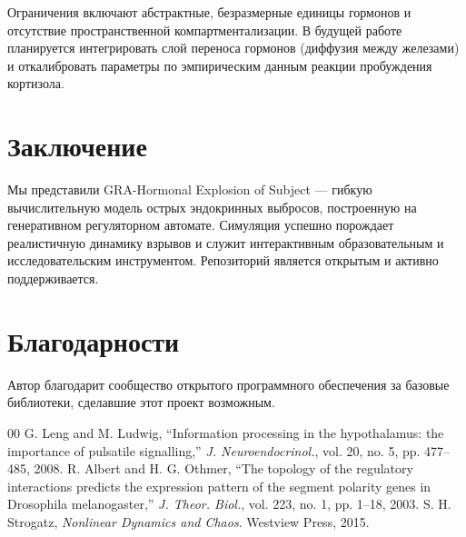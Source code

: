 \documentclass[conference]{IEEEtran}
\begin{document}
Ограничения включают абстрактные, безразмерные единицы гормонов и отсутствие пространственной компартментализации. В будущей работе планируется интегрировать слой переноса гормонов (диффузия между железами) и откалибровать параметры по эмпирическим данным реакции пробуждения кортизола.

\section{Заключение}
Мы представили GRA-Hormonal Explosion of Subject — гибкую вычислительную модель острых эндокринных выбросов, построенную на генеративном регуляторном автомате. Симуляция успешно порождает реалистичную динамику взрывов и служит интерактивным образовательным и исследовательским инструментом. Репозиторий является открытым и активно поддерживается.

\section*{Благодарности}
Автор благодарит сообщество открытого программного обеспечения за базовые библиотеки, сделавшие этот проект возможным.

\begin{thebibliography}{00}
G. Leng and M. Ludwig, ``Information processing in the hypothalamus: the importance of pulsatile signalling,'' \textit{J. Neuroendocrinol.}, vol. 20, no. 5, pp. 477–485, 2008.
R. Albert and H. G. Othmer, ``The topology of the regulatory interactions predicts the expression pattern of the segment polarity genes in Drosophila melanogaster,'' \textit{J. Theor. Biol.}, vol. 223, no. 1, pp. 1–18, 2003.
S. H. Strogatz, \textit{Nonlinear Dynamics and Chaos}. Westview Press, 2015.
\end{thebibliography}
\end{document}
